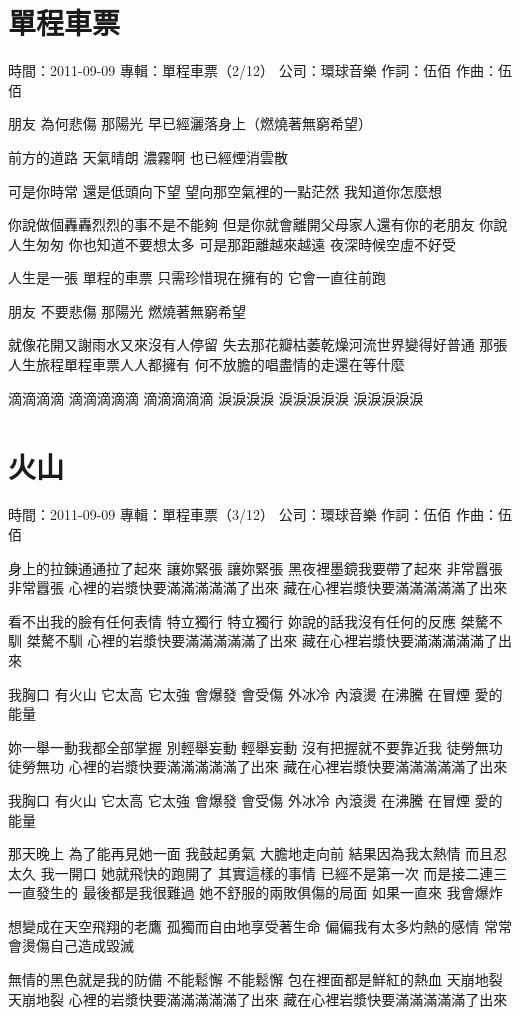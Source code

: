 \documentclass[UTF8,a4paper,oneside,twocolumn,12pt]{ctexbook}
\newcommand{\infopair}[2]{\textbullet #1：#2}
\newcommand{\zc}[1][伍佰]{\infopair{作詞}{#1}}
\newcommand{\zq}[1][伍佰]{\infopair{作曲}{#1}}
\newcommand{\zj}[1]{\infopair{專輯}{#1}}
\newcommand{\sj}[1]{\infopair{時間}{#1}}
\newcommand{\gs}[1]{\infopair{公司}{#1}}
\newenvironment{info}{\begin{flushleft}\kaishu
	}
	{\end{flushleft}\normalsize\yahei\par}
\newenvironment{lyric}{
	}
{}
\begin{document}
\section{單程車票}
\begin{info}
	\sj{2011-09-09}
	\zj{單程車票（2/12）}
	\gs{環球音樂}
	\zc
	\zq
\end{info}
\begin{lyric}
	朋友 為何悲傷
	那陽光 早已經灑落身上（燃燒著無窮希望）

	前方的道路 天氣晴朗
	濃霧啊 也已經煙消雲散

	可是你時常 還是低頭向下望
	望向那空氣裡的一點茫然 我知道你怎麼想

	你說做個轟轟烈烈的事不是不能夠
	但是你就會離開父母家人還有你的老朋友
	你說人生匆匆 你也知道不要想太多
	可是那距離越來越遠 夜深時候空虛不好受

	人生是一張 單程的車票
	只需珍惜現在擁有的 它會一直往前跑

	朋友 不要悲傷
	那陽光 燃燒著無窮希望

	就像花開又謝雨水又來沒有人停留
	失去那花瓣枯萎乾燥河流世界變得好普通
	那張人生旅程單程車票人人都擁有
	何不放膽的唱盡情的走還在等什麼

	滴滴滴滴 滴滴滴滴滴 滴滴滴滴滴
	淚淚淚淚 淚淚淚淚淚 淚淚淚淚淚
\end{lyric}

\section{火山}
\begin{info}
	\sj{2011-09-09}
	\zj{單程車票（3/12）}
	\gs{環球音樂}
	\zc
	\zq
\end{info}
\begin{lyric}
	身上的拉鍊通通拉了起來
	讓妳緊張 讓妳緊張
	黑夜裡墨鏡我要帶了起來
	非常囂張 非常囂張
	心裡的岩漿快要滿滿滿滿滿了出來
	藏在心裡岩漿快要滿滿滿滿滿了出來

	看不出我的臉有任何表情
	特立獨行 特立獨行
	妳說的話我沒有任何的反應
	桀驁不馴 桀驁不馴
	心裡的岩漿快要滿滿滿滿滿了出來
	藏在心裡岩漿快要滿滿滿滿滿了出來

	我胸口 有火山 它太高 它太強
	會爆發 會受傷 外冰冷 內滾燙
	在沸騰 在冒煙 愛的能量

	妳一舉一動我都全部掌握
	別輕舉妄動 輕舉妄動
	沒有把握就不要靠近我
	徒勞無功 徒勞無功
	心裡的岩漿快要滿滿滿滿滿了出來
	藏在心裡岩漿快要滿滿滿滿滿了出來

	我胸口 有火山 它太高 它太強
	會爆發 會受傷 外冰冷 內滾燙
	在沸騰 在冒煙 愛的能量

	那天晚上 為了能再見她一面
	我鼓起勇氣 大膽地走向前
	結果因為我太熱情 而且忍太久
	我一開口 她就飛快的跑開了
	其實這樣的事情 已經不是第一次
	而是接二連三一直發生的
	最後都是我很難過
	她不舒服的兩敗俱傷的局面
	如果一直來 我會爆炸

	想變成在天空飛翔的老鷹
	孤獨而自由地享受著生命
	偏偏我有太多灼熱的感情
	常常會燙傷自己造成毀滅

	無情的黑色就是我的防備
	不能鬆懈 不能鬆懈
	包在裡面都是鮮紅的熱血
	天崩地裂 天崩地裂
	心裡的岩漿快要滿滿滿滿滿了出來
	藏在心裡岩漿快要滿滿滿滿滿了出來
\end{lyric}
\end{document}
